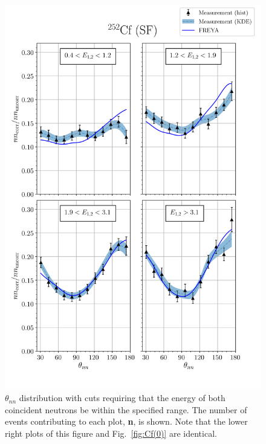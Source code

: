 \begin{figure}
\centering
    \includegraphics[width = \figsize\textwidth]{FinalCf252Resultw_freya2KDE.png}
    \caption{$\theta_{nn}$ distribution with cuts requiring that the energy of both coincident neutrons be within the specified range.
    The number of events contributing to each plot, \textbf{n}, is shown. Note that the lower right plots of this figure and Fig.~\ref{fig:Cf(0)} are identical.}
    \label{fig:Cf(2)}
\end{figure}

